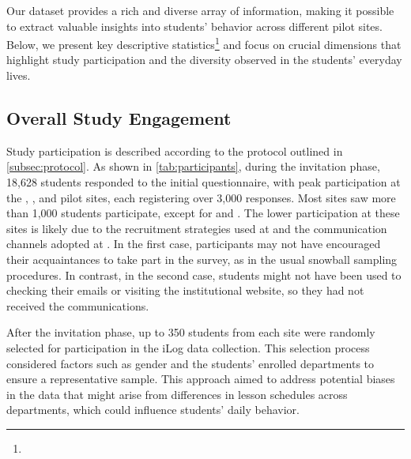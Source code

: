 Our dataset provides a rich and diverse array of information, making it possible to extract valuable insights into students' behavior across different pilot sites. Below, we present key descriptive statistics\footnote{} and focus on crucial dimensions that highlight study participation and the diversity observed in the students' everyday lives.

\subsection{Overall Study Engagement}

\begin{table}[tb]
    \centering
    \caption{\label{tab:participants} }
    
\end{table}

Study participation is described according to the protocol outlined in \cref{subsec:protocol}.
As shown in \cref{tab:participants}, during the invitation phase, 18,628 students responded to the initial questionnaire, with peak participation at the \UNITN, \AMRITA, and \NUM pilot sites, each registering over 3,000 responses. Most sites saw more than 1,000 students participate, except for \IPICYT and \AAU. The lower participation at these sites is likely due to the recruitment strategies used at \IPICYT and the communication channels adopted at \AAU. In the first case, participants may not have encouraged their acquaintances to take part in the survey, as in the usual snowball sampling procedures. In contrast, in the second case, students might not have been used to checking their emails or visiting the institutional website, so they had not received the communications.

After the invitation phase, up to 350 students from each site were randomly selected for participation in the iLog data collection. This selection process considered factors such as gender and the students' enrolled departments to ensure a representative sample. This approach aimed to address potential biases in the data that might arise from differences in lesson schedules across departments, which could influence students' daily behavior.

